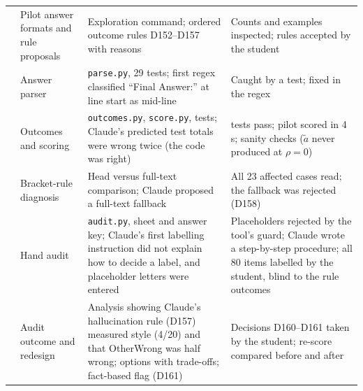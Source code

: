 \documentclass[11pt,a4paper]{report}
\begin{document}
{\begin{longtable}{
  >{\raggedright\arraybackslash}p{0.6cm}
  >{\raggedright\arraybackslash}p{4.4cm}
  >{\raggedright\arraybackslash}p{4.4cm}
  >{\raggedright\arraybackslash}p{4.8cm}}
82 & Pilot answer formats and rule proposals
  & Exploration command; ordered outcome rules D152--D157 with reasons
  & Counts and examples inspected; rules accepted by the student \\
83 & Answer parser
  & \texttt{parse.py}, 29 tests; first regex classified ``Final Answer:'' at line start as mid-line
  & Caught by a test; fixed in the regex \\
84 & Outcomes and scoring
  & \texttt{outcomes.py}, \texttt{score.py}, tests; Claude's predicted test totals were wrong twice (the code was right)
  & 238 tests pass; pilot scored in 4\,s; sanity checks ($\tilde{a}$ never produced at $\rho=0$) \\
85 & Bracket-rule diagnosis
  & Head versus full-text comparison; Claude proposed a full-text fallback
  & All 23 affected cases read; the fallback was rejected (D158) \\
86 & Hand audit
  & \texttt{audit.py}, sheet and answer key; Claude's first labelling instruction did not explain how to decide a label, and placeholder letters were entered
  & Placeholders rejected by the tool's guard; Claude wrote a step-by-step procedure; all 80 items labelled by the student, blind to the rule outcomes \\
87 & Audit outcome and redesign
  & Analysis showing Claude's hallucination rule (D157) measured style (4/20) and that OtherWrong was half wrong; options with trade-offs; fact-based flag (D161)
  & Decisions D160--D161 taken by the student; re-score compared before and after \\


\end{longtable}}
\end{document}
